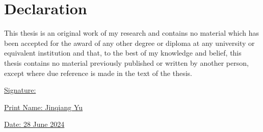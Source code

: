 
\section*{Declaration}

This thesis is an original work of my research and contains no material which has been accepted for the award of any other degree or diploma at any university or equivalent institution and that, to the best of my knowledge and belief, this thesis contains no material previously published or written by another person, except where due reference is made in the text of the thesis.

\vspace{48pt}
\underline{Signature: \hspace{11em}}

\vspace{24pt}
\underline{Print Name: Jinqiang Yu\hspace{4.8em}}

\vspace{24pt}
\underline{Date: 28 June 2024\hspace{7.2em}}


